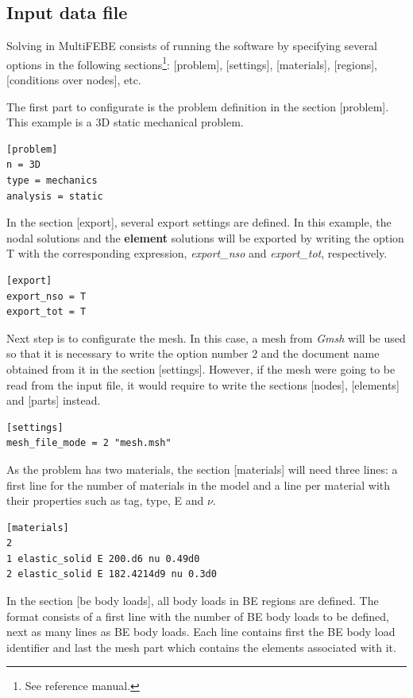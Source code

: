 \documentclass[a4]{article}
\begin{document}
\subsection{Input data file}
Solving in MultiFEBE consists of running the software by specifying several options in the following sections\footnote{See reference manual.}: [problem], [settings], [materials], [regions], [conditions over nodes], etc.

The first part to configurate is the problem definition in the section [problem]. This example is a 3D static mechanical problem.

\begin{Verbatim}	
[problem]
n = 3D
type = mechanics
analysis = static
\end{Verbatim}

In the section [export], several export settings are defined. In this example, the nodal solutions  and the \textbf{element} solutions will be exported by writing the option T with the corresponding expression, \textit{export\_nso} and \textit{export\_tot}, respectively.

\begin{Verbatim}
[export]
export_nso = T
export_tot = T
\end{Verbatim}

Next step is to configurate the mesh. In this case, a mesh from \textit{Gmsh} will be used so that it is necessary to write the option number 2 and the document name obtained from it in the section [settings]. However, if the mesh were going to be read from the input file, it would require to write the sections [nodes], [elements] and [parts] instead.

\begin{Verbatim}	
[settings]
mesh_file_mode = 2 "mesh.msh"
\end{Verbatim}

As the problem has two materials, the section [materials] will need three lines: a first line for the number of materials in the model and a line per material with their properties such as tag, type, E and $\nu$.

\begin{Verbatim}
[materials]
2
1 elastic_solid E 200.d6 nu 0.49d0
2 elastic_solid E 182.4214d9 nu 0.3d0
\end{Verbatim}

In the section [be body loads], all body loads in BE regions are defined. The format consists of a first line with the number of BE body loads to be defined, next as many lines as BE body loads. Each line contains first the BE body load identifier and last the mesh part which contains the elements associated with it.
\end{document}
